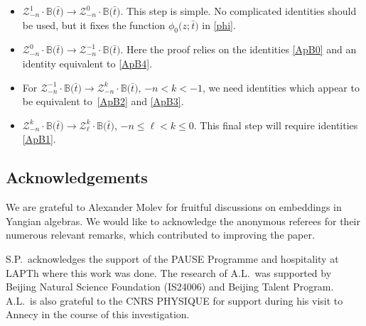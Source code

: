 \documentclass[10pt,a4paper]{amsart}
\newcommand{\bt}{{\bar t}}
\theoremstyle{definition}
\def\BB{{\mathbb{B}}}
\def\r#1{\eqref{#1}}
\def\Z{\mathcal{Z}}
\begin{document}
\begin{itemize}\itemsep=0pt
\item $\Z^1_{-n}\cdot\BB\bigl(\bt\bigr)\to \Z^0_{-n}\cdot\BB\bigl(\bt\bigr)$.
This step is simple. No complicated identities should be used, but it fixes the
function $\phi_0\bigl(z;\bt\bigr)$ in \r{phi}.
\item $\Z^0_{-n}\cdot\BB\bigl(\bt\bigr)\to \Z^{-1}_{-n}\cdot\BB\bigl(\bt\bigr)$.
Here the proof relies on the identities
\r{ApB0} and an identity equivalent to \r{ApB4}.
 \item For $\Z^{-1}_{-n}\cdot\BB\bigl(\bt\bigr)\to \Z^k_{-n}\cdot\BB\bigl(\bt\bigr)$, $-n<k< -1$,
 we need identities which appear to be equivalent to~\r{ApB2} and \r{ApB3}.
\item $\Z^k_{-n}\cdot\BB\bigl(\bt\bigr)\to \Z^k_{\ell}\cdot\BB\bigl(\bt\bigr)$, $-n\leq \ell< k\leq 0$.
This final step will require identities \r{ApB1}.
\end{itemize}




\subsection*{Acknowledgements}
We are grateful to Alexander Molev for fruitful discussions on embeddings in Yangian algebras.
We would like to acknowledge the anonymous referees for their numerous relevant remarks, which contributed to improving the paper.

S.P.~acknowledges the support of the PAUSE Programme and hospitality at LAPTh where
this work was done.
The research of A.L.\ was supported by Beijing Natural Science Foundation (IS24006) and Beijing Talent Program.
A.L.\ is also grateful to the CNRS PHYSIQUE for support during his visit to
Annecy in the course of this investigation.




\end{document}
